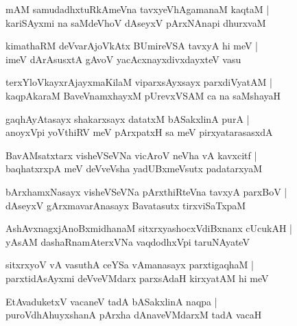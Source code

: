 \begin{shloka}
mAM samudadhxtuRkAmeVna tavxyeVhAgamanaM kaqtaM |\\
kariSAyxmi na saMdeVhoV dAseyxV pArxNAnapi dhurxvaM
\end{shloka}

\begin{shloka}
kimathaRM deVvarAjoVkAtx BUmireVSA tavxyA hi meV |\\
imeV dArAsusxtA gAvoV yacAcxnayxdivxdayxteV vasu
\end{shloka}

\begin{shloka}
terxYloVkayxrAjayxmaKilaM viparxsAyxsayx parxdiVyatAM |\\
kaqpAkaraM BaveVnamxhayxM pUrevxVSAM ca na saMshayaH
\end{shloka}

\begin{shloka}
gaqhAyAtasayx shakarxsayx datatxM bASakxlinA purA |\\
anoyxVpi yoVthiRV meV pArxpatxH sa meV pirxyatarasasxdA 
\end{shloka}

\begin{shloka}
BavAMsatxtarx visheVSeVNa vicAroV neVha vA kavxcitf |\\
baqhatxrxpA meV deVveVsha yadUBxmeVsutx padatarxyaM
\end{shloka}

\begin{shloka}
bArxhamxNasayx visheVSeVNa pArxthiRteVna tavxyA parxBoV |\\
dAseyxV gArxmavarAnasayx Bavatasutx tirxviSaTxpaM
\end{shloka}

\begin{shloka}
AshAvxnagxjAnoBxmidhanaM sitxrxyashocxVdiBxnanx cUcukAH |\\
yAsAM dashaRnamAterxVNa vaqdodhxVpi taruNAyateV
\end{shloka}

\begin{shloka}
sitxrxyoV vA vasuthA ceYSa vAmanasayx parxtigaqhaM |\\
parxtidAsAyxmi deVveVMdarx parxsAdaH kirxyatAM hi meV
\end{shloka}

\begin{shloka}
EtAvaduketxV vacaneV tadA bASakxlinA naqpa |\\
puroVdhAhuyxshanA pArxha dAnaveVMdarxM tadA vacaH
\end{shloka}

